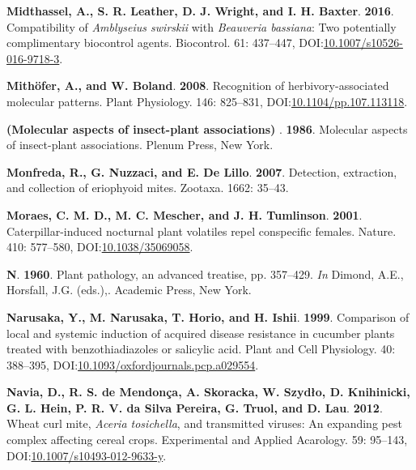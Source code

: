 \documentclass[12pt,final,CPage]{ufthesis}
\newlength{\cslhangindent}
\newenvironment{CSLReferences}[2] %
{%
	\setlength{\parindent}{0pt}
	\ifodd #1 \everypar{\setlength{\hangindent}{\cslhangindent}}\ignorespaces\fi
	\ifnum #2 > 0
	\setlength{\parskip}{#2\baselineskip}
	\fi
}%
{}
\begin{document}
{\begin{CSLReferences}{1}{0}
  \leavevmode{}%
  \textbf{Midthassel, A., S. R. Leather, D. J. Wright, and I. H. Baxter}. \textbf{2016}. Compatibility of {\emph{Amblyseius swirskii}} with {\emph{Beauveria bassiana}}: Two potentially complimentary biocontrol agents. Biocontrol. 61: 437--447, DOI:\href{https://doi.org/10.1007/s10526-016-9718-3}{10.1007/s10526-016-9718-3}.

  \leavevmode{}%
  \textbf{Mithöfer, A., and W. Boland}. \textbf{2008}. Recognition of herbivory-associated molecular patterns. Plant Physiology. 146: 825--831, DOI:\href{https://doi.org/10.1104/pp.107.113118}{10.1104/pp.107.113118}.

  \leavevmode{}%
  \textbf{(Molecular aspects of insect-plant associations) }. \textbf{1986}. Molecular aspects of insect-plant associations. Plenum Press, New York.

  \leavevmode{}%
  \textbf{Monfreda, R., G. Nuzzaci, and E. De Lillo}. \textbf{2007}. Detection, extraction, and collection of eriophyoid mites. Zootaxa. 1662: 35--43.

  \leavevmode{}%
  \textbf{Moraes, C. M. D., M. C. Mescher, and J. H. Tumlinson}. \textbf{2001}. Caterpillar-induced nocturnal plant volatiles repel conspecific females. Nature. 410: 577--580, DOI:\href{https://doi.org/10.1038/35069058}{10.1038/35069058}.

  \leavevmode{}%
  \textbf{N}. \textbf{1960}. Plant pathology, an advanced treatise, pp. 357--429. \emph{In} Dimond, A.E., Horsfall, J.G. (eds.),. Academic Press, New York.

  \leavevmode{}%
  \textbf{Narusaka, Y., M. Narusaka, T. Horio, and H. Ishii}. \textbf{1999}. Comparison of local and systemic induction of acquired disease resistance in cucumber plants treated with benzothiadiazoles or salicylic acid. Plant and Cell Physiology. 40: 388--395, DOI:\href{https://doi.org/10.1093/oxfordjournals.pcp.a029554}{10.1093/oxfordjournals.pcp.a029554}.

  \leavevmode{}%
  \textbf{Navia, D., R. S. de Mendonça, A. Skoracka, W. Szydło, D. Knihinicki, G. L. Hein, P. R. V. da Silva Pereira, G. Truol, and D. Lau}. \textbf{2012}. {Wheat curl mite}, {\emph{Aceria tosichella}}, and transmitted viruses: An expanding pest complex affecting cereal crops. Experimental and Applied Acarology. 59: 95--143, DOI:\href{https://doi.org/10.1007/s10493-012-9633-y}{10.1007/s10493-012-9633-y}.


\end{CSLReferences}}
\end{document}

